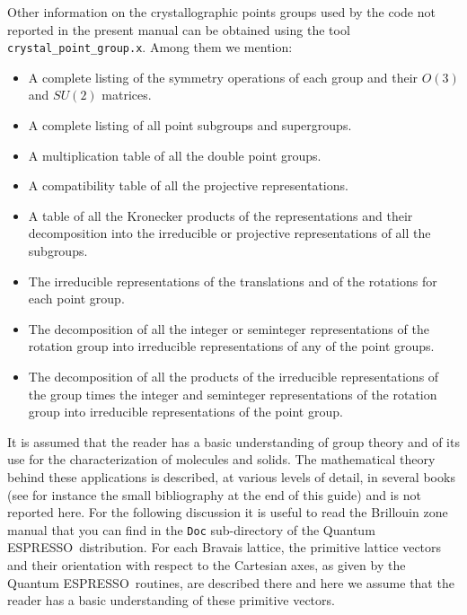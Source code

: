 \documentclass[12pt,a4paper]{article}
\def\qe{{\sc Quantum ESPRESSO}}
\begin{document}
Other information on the crystallographic points groups used by the code 
not reported in the present manual can be obtained using the tool 
\texttt{crystal\_point\_group.x}. Among them we mention:
\begin{itemize}

\item A complete listing of the symmetry operations of each group
and their $O(3)$ and $SU(2)$ matrices.

\item A complete listing of all point subgroups and supergroups.

\item A multiplication table of all the double point groups.

\item A compatibility table of all the projective representations.

\item A table of all the Kronecker products of the representations and
their decomposition into the irreducible or projective representations
of all the subgroups.

\item The irreducible representations of the translations and of the rotations
for each point group.

\item The decomposition of all the integer or seminteger representations
of the rotation group into irreducible representations of any of the point groups.

\item The decomposition of all the products of the irreducible representations 
of the group times the integer and seminteger representations of the 
rotation group into irreducible representations of the point group.

\end{itemize}
It is assumed that the reader has a basic understanding of group theory and
of its use for the characterization of molecules and solids.
The mathematical theory behind these applications is described, 
at various levels of detail, in several books (see for instance the small 
bibliography at the end of this guide) and is not reported here. 
For the following discussion it is useful to read the Brillouin zone 
manual that you can find in the \texttt{Doc} sub-directory of the 
\qe\ distribution. For each Bravais lattice, the primitive lattice vectors
and their orientation with respect to the Cartesian axes, as given by the
\qe\ routines, are described there and here we assume that the reader has a
basic understanding of these primitive vectors. 
\end{document}
